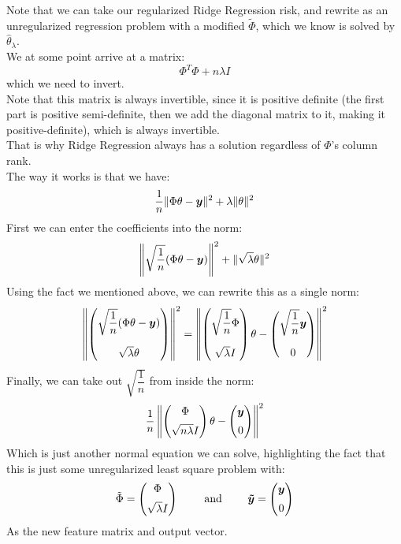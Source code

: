 \documentclass[12pt]{article}
\begin{document}
Note that we can take our regularized
Ridge Regression risk, and rewrite as an 
unregularized regression problem with a modified
$\tilde{\Phi}$, which we know is solved by 
$\hat{\theta}_\lambda$. \\
We at some point arrive at a matrix:
\[ \Phi^T\Phi + n \lambda I \]
which we need to invert. \\
Note that this matrix is always invertible,
since it is positive definite (the first
part is positive semi-definite,
then we add the diagonal matrix to it,
making it positive-definite),
which is always invertible. \\
That is why Ridge Regression always has a
solution regardless of $\Phi$'s column rank. \\

The way it works is that we have:
\[ \dfrac{1}{n}
\|\Phi \theta - \boldsymbol{y}\|^2 
+ \lambda \|\theta\|^2 \]
First we can enter the coefficients into the norm:
\[ \left\| \sqrt{\dfrac{1}{n}} (\Phi \theta 
- \boldsymbol{y}) \right\|^2
+ \| \sqrt{\lambda} \theta \|^2  \]
Using the fact we mentioned above, we can
rewrite this as a single norm:
\[ \left\| \pmat{\sqrt{\dfrac{1}{n}} 
(\Phi \theta - \bl{y})
\vspace{10pt} \\ \sqrt{\lambda} \theta } \right\|^2
= \left\| \pmat{\sqrt{\dfrac{1}{n}} \Phi
\vspace{10pt} \\ \sqrt{\lambda}I} \theta
- \pmat{\sqrt{\dfrac{1}{n}} \bl{y} 
\vspace{10pt} \\ 0} \right\|^2 \]
Finally, we can take out $\sqrt{\dfrac{1}{n}}$
from inside the norm:
\[ \dfrac{1}{n} \left\| 
\pmat{\Phi \vspace{5pt} \\ \sqrt{n\lambda}I} \theta
- \pmat{\bl{y} \vspace{5pt} \\ 0} \right\|^2 \]
Which is just another normal equation we can solve,
highlighting the fact that this is just
some unregularized least square problem with:
\[ \tilde{\Phi} = 
\pmat{\Phi \vspace{5pt} \\ \sqrt{\lambda}I}
\qquad \AND \qquad 
\bl{\tilde{y}} = 
\pmat{\bl{y} \vspace{5pt} \\ 0} \]
As the new feature matrix and output vector. \\

\newpage
\end{document}
